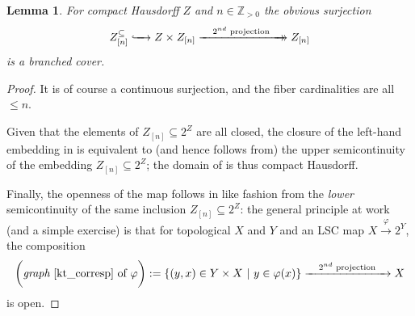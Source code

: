\documentclass[11pt,leqno]{article}
\theoremstyle{plain}
\newtheorem{lemma}{Lemma}[section]
\theoremstyle{plain}
\theoremstyle{plain}
\numberwithin{equation}{section}
\theoremstyle{nonumberplain}
\newtheorem{proof}{Proof}
\newcommand\bZ{{\mathbb Z}}
\newcommand\1{{\bf 1}}
\newcommand{\xrightarrowdbl}[2][]{%
  \xrightarrow[#1]{#2}\mathrel{\mkern-14mu}\rightarrow
}
\begin{document}
\begin{lemma}\label{le:inc.corr.brnch}
  For compact Hausdorff $Z$ and $n\in \bZ_{>0}$ the obvious surjection
  \begin{equation}\label{eq:zn.corresp}
    Z_{[n]}^{\subseteq}
    \lhook\joinrel\xrightarrow{\quad}
    Z\times Z_{[n]}
    \xrightarrowdbl{\quad\text{$2^{nd}$ projection}\quad}
    Z_{[n]}
  \end{equation}
  is a branched cover. 
\end{lemma}
\begin{proof}
  It is of course a continuous surjection, and the fiber cardinalities are all $\le n$.

  Given that the elements of $Z_{[n]}\subseteq 2^Z$ are all closed, the closure of the left-hand embedding in  is equivalent \cite[Theorems 7.1.15 and 7.1.16]{kt_corresp} to (and hence follows from) the upper semicontinuity of the embedding $Z_{[n]}\subseteq 2^Z$; the domain of  is thus compact Hausdorff.

  Finally, the openness of the map follows in like fashion from the {\it lower} semicontinuity of the same inclusion $Z_{[n]}\subseteq 2^Z$: the general principle at work (and a simple exercise) is that for topological $X$ and $Y$ and an LSC map $X\xrightarrow{\varphi} 2^Y$, the composition
  \begin{equation*}
    \bigg(\text{{\it graph} \cite[Definition 6.1.2]{kt_corresp} of $\varphi$}\bigg)
    :=
    \left\{(y,x)\in Y\times X\ |\ y\in \varphi(x)\right\}
    \xrightarrow{\quad\text{$2^{nd}$ projection}\quad}
    X
  \end{equation*}
  is open.
\end{proof}

\end{document}
